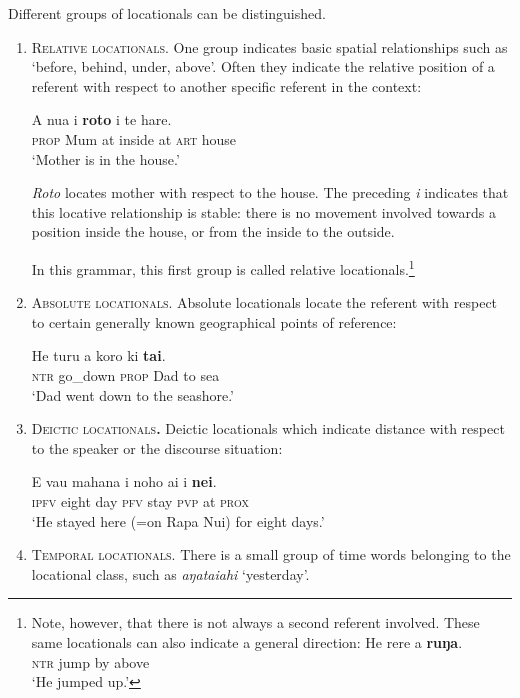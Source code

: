 Different groups of locationals can be distinguished. 
\begin{enumerate}
\item 
\textsc{Relative locationals.} One group indicates basic spatial relationships such as ‘before, behind, under, above’. Often they indicate the relative position of a referent with respect to another specific referent in the context:

\ea\label{ex:3.126}
\gll A nua {\ꞌ}i \textbf{roto} i te hare. \\
\textsc{prop} Mum at inside at \textsc{art} house \\

\glt
‘Mother is in the house.’ \textstyleExampleref{[R333.284]} 
\z

\textit{Roto} locates mother with respect to the house. The preceding  \textit{{\ꞌ}i} indicates that this locative relationship is stable: there is no movement involved towards a position inside the house, or from the inside to the outside.

In this grammar, this first group is called relative locationals.\footnote{\label{fn:139}Note, however, that there is not always a second referent involved. These same locationals can also indicate a general direction:
\ea
\gll
He rere a \textbf{ruŋa}.\\
  \textsc{ntr} jump by above\\
 \glt
 ‘He jumped up.’
\z
}
\item
\textsc{Absolute locationals}. Absolute locationals locate the referent with respect to certain generally known geographical points of reference:

\ea\label{ex:3.127}
\gll He turu a koro ki \textbf{tai}. \\
\textsc{ntr} go\_down \textsc{prop} Dad to sea \\

\glt
‘Dad went down to the seashore.’ \textstyleExampleref{[R333.388]} 
\z

\item
\textsc{Deictic locationals}\textbf{.} Deictic locationals which indicate distance with respect to the speaker or the discourse situation:

\ea\label{ex:3.128}
\gll E va{\ꞌ}u mahana i noho ai {\ꞌ}i \textbf{nei}. \\
\textsc{ipfv} eight day \textsc{pfv} stay \textsc{pvp} at \textsc{prox} \\

\glt
‘He stayed here (=on Rapa Nui) for eight days.’ \textstyleExampleref{[R374.005]} 
\z

\item
\textsc{Temporal locationals.} There is a small group of time words belonging to the locational class, such as \textit{{\ꞌ}aŋataiahi} ‘yesterday’.
\end{enumerate}
